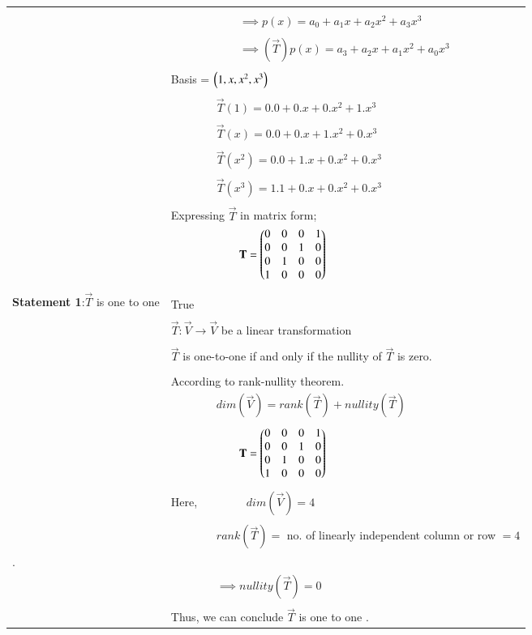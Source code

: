 \documentclass[journal,12pt]{IEEEtran}
\begin{document}
\begin{longtable}{|p{5cm}|p{13cm}|}
	&\\
	& $\qquad\qquad\qquad\implies p(x)=a_0+a_1x+a_2x^{2}+a_3x^{3}$\\
	&\\
	& $\qquad\qquad\qquad\implies (\vec{T})p(x)=a_3+a_2x+a_1x^2+a_0x^3$\\
	&\\
	& Basis = $\left(1,x,x^2,x^3\right)$\\
	&\\
    & $\qquad\qquad\vec{T}(1) = 0.0+0.x+0.x^2+1.x^3$\\
    &\\
    & $\qquad\qquad\vec{T}(x) = 0.0+0.x+1.x^2+0.x^3$\\
    &\\
    & $\qquad\qquad\vec{T}(x^2) = 0.0+1.x+0.x^2+0.x^3$\\
    &\\
    & $\qquad\qquad\vec{T}(x^3) = 1.1+0.x+0.x^2+0.x^3$\\
    &\\
    & Expressing $\vec{T}$ in matrix form;\\
\hline
    & $\qquad\qquad\qquad\mathbf{T}=\begin{pmatrix}0&0&0&1\\0&0&1&0\\0&1&0&0\\1&0&0&0\end{pmatrix}$\\
	&\\
	\hline
	\multirow{3}{*}{\textbf{Statement 1}:$\vec{T}$ is one to one } & \\
	& True\\
	\hline
	&\\
	& $\vec{T}:\vec{V}\rightarrow\vec{V}$ be a linear transformation\\
	&\\
	& $\vec{T}$ is one-to-one if and only if the nullity of $\vec{T}$ is zero.\\
	&\\
	& According to rank-nullity theorem.\\
    & $\qquad\qquad dim(\vec{V})=rank(\vec{T})+nullity(\vec{T})$\\
    &\\
    & $\qquad\qquad\qquad\mathbf{T}=\begin{pmatrix}0&0&0&1\\0&0&1&0\\0&1&0&0\\1&0&0&0\end{pmatrix}$\\
	&\\
	& Here, $\qquad\qquad dim(\vec{V}) = 4$\\
	&\\
	& $\qquad\qquad rank(\vec{T})=$ no. of linearly independent column or row $=4$\\.
	&\\
	& $\qquad\qquad\implies nullity (\vec{T}) = 0$\\
	&\\
	& Thus, we can conclude $\vec{T}$ is one to one .\\
	  

\end{longtable}
\end{document}
